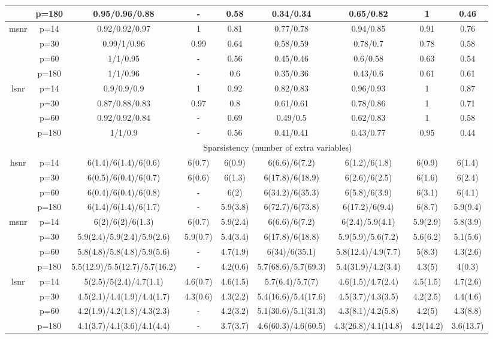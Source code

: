 \begin{table}[ht]
{\begin{tabular}{|c|c|ccccccc|}
   & p=180 & 0.95/0.96/0.88 & - & 0.58 & 0.34/0.34 & 0.65/0.82 & 1 & 0.46 \\ 
  \midrule\multirow{4}[2]{*}{msnr} & p=14 & 0.92/0.92/0.97 & 1 & 0.81 & 0.77/0.78 & 0.94/0.85 & 0.91 & 0.76 \\ 
   & p=30 & 0.99/1/0.96 & 0.99 & 0.64 & 0.58/0.59 & 0.78/0.7 & 0.78 & 0.58 \\ 
   & p=60 & 1/1/0.95 & - & 0.56 & 0.45/0.46 & 0.6/0.58 & 0.63 & 0.54 \\ 
   & p=180 & 1/1/0.96 & - & 0.6 & 0.35/0.36 & 0.43/0.6 & 0.61 & 0.61 \\ 
  \midrule\multirow{4}[2]{*}{lsnr} & p=14 & 0.9/0.9/0.9 & 1 & 0.92 & 0.82/0.83 & 0.96/0.93 & 1 & 0.87 \\ 
   & p=30 & 0.87/0.88/0.83 & 0.97 & 0.8 & 0.61/0.61 & 0.78/0.86 & 1 & 0.71 \\ 
   & p=60 & 0.92/0.92/0.84 & - & 0.69 & 0.49/0.5 & 0.62/0.83 & 1 & 0.58 \\ 
   & p=180 & 1/1/0.9 & - & 0.56 & 0.41/0.41 & 0.43/0.77 & 0.95 & 0.44 \\ 
   \midrule 
 \multicolumn{1}{|c}{} &       & \multicolumn{7}{c|}{Sparsistency (number of extra variables)} \\
\midrule\multirow{4}[2]{*}{hsnr} & p=14 & 6(1.4)/6(1.4)/6(0.6) & 6(0.7) & 6(0.9) & 6(6.6)/6(7.2) & 6(1.2)/6(1.8) & 6(0.9) & 6(1.4) \\ 
   & p=30 & 6(0.5)/6(0.4)/6(0.7) & 6(0.6) & 6(1.3) & 6(17.8)/6(18.9) & 6(2.6)/6(2.5) & 6(1.6) & 6(2.4) \\ 
   & p=60 & 6(0.4)/6(0.4)/6(0.8) & - & 6(2) & 6(34.2)/6(35.3) & 6(5.8)/6(3.9) & 6(3.1) & 6(4.1) \\ 
   & p=180 & 6(1.4)/6(1.4)/6(1.7) & - & 5.9(3.8) & 6(72.7)/6(73.8) & 6(17.2)/6(9.4) & 6(8.7) & 5.9(9.4) \\ 
  \midrule\multirow{4}[2]{*}{msnr} & p=14 & 6(2)/6(2)/6(1.3) & 6(0.7) & 5.9(2.4) & 6(6.6)/6(7.2) & 6(2.4)/5.9(4.1) & 5.9(2.9) & 5.8(3.9) \\ 
   & p=30 & 5.9(2.4)/5.9(2.4)/5.9(2.6) & 5.9(0.7) & 5.4(3.4) & 6(17.8)/6(18.8) & 5.9(5.9)/5.6(7.2) & 5.6(6.2) & 5.1(5.6) \\ 
   & p=60 & 5.8(4.8)/5.8(4.8)/5.9(5.6) & - & 4.7(1.9) & 6(34)/6(35.1) & 5.8(12.4)/4.9(7.7) & 5(8.3) & 4.3(2.6) \\ 
   & p=180 & 5.5(12.9)/5.5(12.7)/5.7(16.2) & - & 4.2(0.6) & 5.7(68.6)/5.7(69.3) & 5.4(31.9)/4.2(3.4) & 4.3(5) & 4(0.3) \\ 
  \midrule\multirow{4}[2]{*}{lsnr} & p=14 & 5(2.5)/5(2.4)/4.7(1.1) & 4.6(0.7) & 4.6(1.5) & 5.7(6.4)/5.7(7) & 4.6(1.5)/4.7(2.4) & 4.5(1.5) & 4.7(2.6) \\ 
   & p=30 & 4.5(2.1)/4.4(1.9)/4.4(1.7) & 4.3(0.6) & 4.3(2.2) & 5.4(16.6)/5.4(17.6) & 4.5(3.7)/4.3(3.5) & 4.2(2.5) & 4.4(4.6) \\ 
   & p=60 & 4.2(1.9)/4.2(1.8)/4.3(2.3) & - & 4.2(3.2) & 5.1(30.6)/5.1(31.3) & 4.3(8.1)/4.2(5.8) & 4.2(5) & 4.3(8.8) \\ 
   & p=180 & 4.1(3.7)/4.1(3.6)/4.1(4.4) & - & 3.7(3.7) & 4.6(60.3)/4.6(60.5) & 4.3(26.8)/4.1(14.8) & 4.2(14.2) & 3.6(13.7) \\ 
   \bottomrule 
\end{tabular}
}
\end{table}
